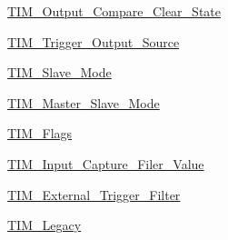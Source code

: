 \begin{DoxyCompactItemize}
\hyperlink{group__TIM__Output__Compare__Clear__State}{TIM\_\-Output\_\-Compare\_\-Clear\_\-State}
\item 
\hyperlink{group__TIM__Trigger__Output__Source}{TIM\_\-Trigger\_\-Output\_\-Source}
\item 
\hyperlink{group__TIM__Slave__Mode}{TIM\_\-Slave\_\-Mode}
\item 
\hyperlink{group__TIM__Master__Slave__Mode}{TIM\_\-Master\_\-Slave\_\-Mode}
\item 
\hyperlink{group__TIM__Flags}{TIM\_\-Flags}
\item 
\hyperlink{group__TIM__Input__Capture__Filer__Value}{TIM\_\-Input\_\-Capture\_\-Filer\_\-Value}
\item 
\hyperlink{group__TIM__External__Trigger__Filter}{TIM\_\-External\_\-Trigger\_\-Filter}
\item 
\hyperlink{group__TIM__Legacy}{TIM\_\-Legacy}
\end{DoxyCompactItemize}
